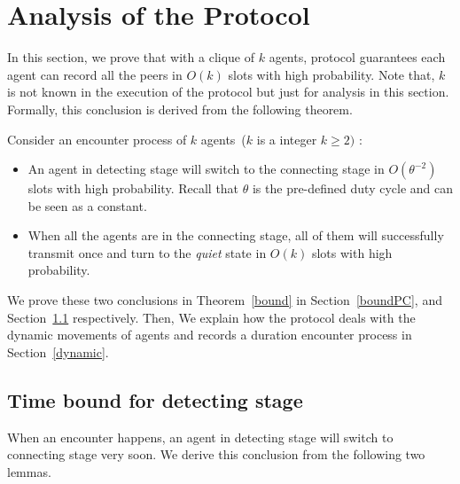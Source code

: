 \section{Analysis of the {\pName} Protocol}
\label{sectionanalysis}

In this section, we prove that with a clique of $k$ agents,  
{\pName} protocol guarantees each agent can record all
the peers in $O(k)$ slots with high probability.
Note that, $k$ is not known in the execution of the protocol but just for analysis
in this section.
Formally, this conclusion is derived from the following theorem.
\begin{theorem}
    \label{bound}
    Consider an encounter process of $k$ agents~($k$ is a integer $k \geq 2)$ :
    \begin{itemize} 
    \item[(1)] An agent in detecting stage  will switch to the connecting stage in $O(\theta^{-2})$
    slots with high probability. Recall that $\theta$ is the pre-defined duty cycle and can be seen 
    as a constant.
    \item[(2)] When all the agents are in the connecting stage, all of them will
    successfully transmit once and turn to the \emph{quiet} state 
    in $O(k)$ slots with high probability.
    \end{itemize}
\end{theorem}

We prove these two conclusions in Theorem~\ref{bound} in Section~\ref{boundPC}, and
Section~\ref{boundSW} respectively. 
Then, We explain how the {\pName} protocol deals with the dynamic movements
of agents and records a duration encounter process in Section~\ref{dynamic}.

\subsection{Time bound for detecting stage}
\label{boundSW}

When an encounter happens, an agent in detecting stage will switch to connecting stage very soon. 
We derive this conclusion from the following two lemmas.

